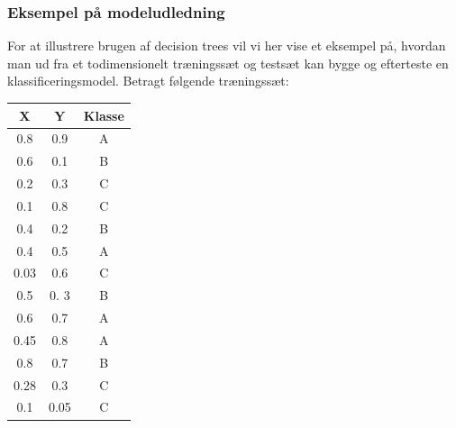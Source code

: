 \documentclass{article}
\begin{document}
\subsubsection{Eksempel på modeludledning}
For at illustrere brugen af decision trees vil vi her vise et eksempel på, hvordan man ud fra et todimensionelt træningssæt og testsæt kan bygge og efterteste en klassificeringsmodel. Betragt følgende træningssæt:

\begin{tabular}{c|c|c}
	X & Y & Klasse\\
	\hline
	0.8 & 0.9 & A\\
	0.6 & 0.1 & B\\
	0.2 & 0.3 & C\\
	0.1 & 0.8 & C\\
	0.4 & 0.2 & B\\
	0.4 & 0.5 & A\\
	0.03 & 0.6 & C\\
	0.5 & 0. 3 & B\\
	0.6 & 0.7 & A\\
	0.45 & 0.8 & A\\
	0.8 & 0.7 & B\\
	0.28 & 0.3 & C\\
	0.1 & 0.05 & C
\end{tabular} 
\end{document}
